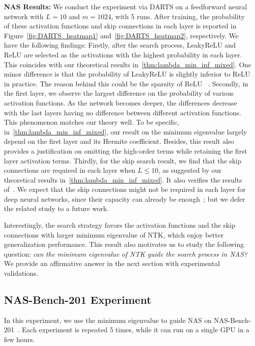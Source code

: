 \documentclass[nohyperref]{article}
\theoremstyle{plain}
\theoremstyle{definition}
\theoremstyle{remark}
\begin{document}
{\bf NAS Results:} 
We conduct the experiment via DARTS on a feedforward neural network with $L=10$ and $m=1024$, with 5 runs.
After training, the probability of these activation functions and skip connections in each layer is reported in Figure~\ref{fig:DARTS_heatmap1} and~\ref{fig:DARTS_heatmap2}, respectively. We have the following findings:
Firstly, after the search process, LeakyReLU and ReLU are selected as the activations with the highest probability in each layer.
This coincides with our theoretical results in~\cref{thm:lambda_min_inf_mixed}. One minor difference is that the probability of LeakyReLU is slightly inferior to ReLU in practice.
The reason behind this could be the sparsity of ReLU ~\citep{dedios2020sparsity}.
Secondly, in the first layer, we observe the largest difference on the probability of various activation functions. As the network becomes deeper, the differences decrease with the last layers having no difference between different activation functions. This phenomenon matches our theory well. To be specific, in~\cref{thm:lambda_min_inf_mixed}, our result on the minimum eigenvalue largely depend on the first layer and its Hermite coefficient. Besides, this result also provides a justification on omitting the high-order terms while retaining the first layer activation terms. Thirdly, for the skip search result, we find that the skip connections are required in each layer when $L\leq 10$, as suggested by our theoretical results in~\cref{thm:lambda_min_inf_mixed}. It also verifies the results of~\citet{zhou2020theory}. We expect that the skip connections might not be required in each layer for deep neural networks, since their capacity can already be enough~\citep{7780459}; but we defer the related study to a future work. 


Interestingly, the search strategy favors the activation functions and the skip connections with larger minimum eigenvalue of NTK, which enjoy better generalization performance.
This result also motivates us to study the following question: \emph{can the minimum eigenvalue of NTK guide the search process in NAS?}
We provide an affirmative answer in the next section with experimental validations.

\subsection{NAS-Bench-201 Experiment}
\label{ssec:NAS_201_experiment}

In this experiment, we use the minimum eigenvalue to guide NAS on NAS-Bench-201~\citep{dong2020nasbench201}. Each experiment is repeated 5 times, while it can run on a single GPU in a few hours. 
\end{document}
